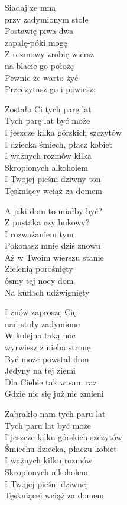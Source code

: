 \begin{text}
    \hfill\break
Siadaj ze mną\\
przy zadymionym stole\\
Postawię piwa dwa\\
zapalę-póki mogę\\
Z rozmowy zrobię wiersz\\
na blacie go położę\\
Pewnie że warto żyć\\
Przeczytasz go i powiesz:

    \vin Zostało Ci tych parę lat\\
    \vin Tych parę lat być może\\
    \vin I jeszcze kilka górskich szczytów\\
    \vin I dziecka śmiech, płacz kobiet\\
    \vin I ważnych rozmów kilka\\
    \vin Skropionych alkoholem\\
    \vin I Twojej pieśni dziwny ton\\
    \vin Tęskniący wciąż za domem

A jaki dom to miałby być?\\
Z pustaka czy bukowy?\\
I rozważaniem tym\\
Pokonasz mnie dziś znowu\\
Aż w Twoim wierszu stanie\\
Zielenią porośnięty\\
ósmy tej nocy dom\\
Na kuflach udźwignięty

I znów zaproszę Cię\\
nad stoły zadymione\\
W kolejna taką noc\\
wyrwiesz z nieba stronę\\
Być może powstał dom\\
Jedyny na tej ziemi\\
Dla Ciebie tak w sam raz\\
Gdzie nic się już nie zmieni

\vin Zabrakło nam tych paru lat\\
\vin Tych paru lat być może\\
\vin I jeszcze kilku górskich szczytów\\
\vin Śmiechu dziecka, płaczu kobiet\\
\vin I ważnych kilku rozmów\\
\vin Skropionych alkoholem\\
\vin I Twojej pieśni dziwnej\\
\vin Tęskniącej wciąż za domem
\end{text}

